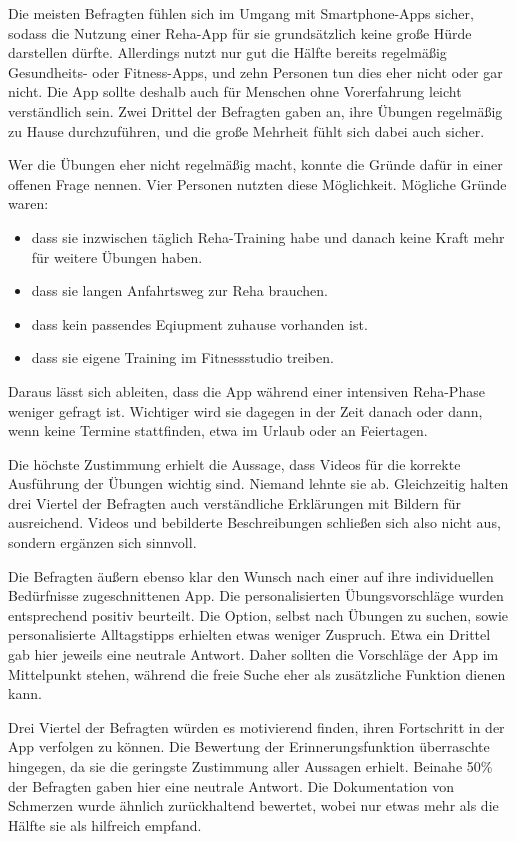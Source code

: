 Die meisten Befragten fühlen sich im Umgang mit Smartphone-Apps sicher, sodass
die Nutzung einer Reha-App für sie grundsätzlich keine große Hürde darstellen
dürfte. Allerdings nutzt nur gut die Hälfte bereits regelmäßig Gesundheits-
oder Fitness-Apps, und zehn Personen tun dies eher nicht oder gar nicht. Die
App sollte deshalb auch für Menschen ohne Vorerfahrung leicht verständlich
sein. Zwei Drittel der Befragten gaben an, ihre Übungen regelmäßig zu Hause
durchzuführen, und die große Mehrheit fühlt sich dabei auch sicher.

Wer die Übungen eher nicht regelmäßig macht, konnte die Gründe dafür in einer
offenen Frage nennen. Vier Personen nutzten diese Möglichkeit. Mögliche Gründe waren:
\begin{itemize}
    \item dass sie inzwischen täglich Reha-Training habe und danach keine Kraft
    mehr für weitere Übungen haben.
    \item dass sie langen Anfahrtsweg zur
    Reha brauchen.
    \item dass kein passendes Eqiupment zuhause vorhanden ist.
    \item dass sie eigene Training im Fitnessstudio treiben.
\end{itemize}
Daraus lässt sich ableiten, dass die App während einer intensiven Reha-Phase weniger
gefragt ist. Wichtiger wird sie dagegen in der Zeit danach oder dann, wenn
keine Termine stattfinden, etwa im Urlaub oder an Feiertagen.

Die höchste Zustimmung erhielt die Aussage, dass Videos für die korrekte
Ausführung der Übungen wichtig sind. Niemand lehnte sie ab. Gleichzeitig
halten drei Viertel der Befragten auch verständliche Erklärungen mit Bildern
für ausreichend. Videos und bebilderte Beschreibungen schließen sich also
nicht aus, sondern ergänzen sich sinnvoll.

Die Befragten äußern ebenso klar den Wunsch nach einer auf ihre individuellen Bedürfnisse zugeschnittenen App. Die personalisierten Übungsvorschläge wurden entsprechend positiv beurteilt. Die Option, selbst nach Übungen zu suchen, sowie personalisierte Alltagstipps erhielten etwas weniger Zuspruch. Etwa ein Drittel gab hier jeweils eine neutrale Antwort. Daher sollten die Vorschläge der App im Mittelpunkt stehen, während die freie Suche eher als zusätzliche Funktion dienen kann.

Drei Viertel der Befragten würden es motivierend finden, ihren Fortschritt in der App verfolgen zu können. Die Bewertung der Erinnerungsfunktion überraschte hingegen, da sie die geringste Zustimmung aller Aussagen erhielt. Beinahe 50\% der Befragten gaben hier eine neutrale Antwort. Die Dokumentation von Schmerzen wurde ähnlich zurückhaltend bewertet, wobei nur etwas mehr als die Hälfte sie als hilfreich empfand.


